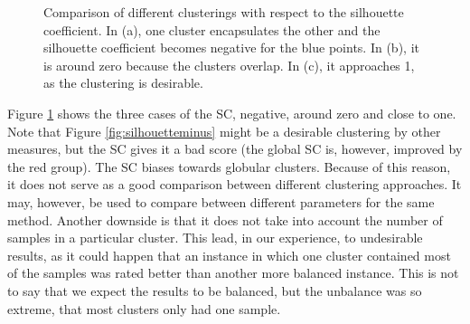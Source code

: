 \documentclass[conference]{IEEEtran}
\begin{document}
\begin{figure}[!h]
\centering
{}
\hfill
{}
\vfill
{}
\caption{Comparison of different clusterings with respect to the silhouette coefficient. In (a), one cluster encapsulates the other and the silhouette coefficient becomes negative for the blue points. In (b), it is around zero because the clusters overlap. In (c), it approaches 1, as the clustering is desirable. } 
\label{fig:silhouette}
\end{figure}


Figure \ref{fig:silhouette} shows the three cases of the SC, negative, around zero and close to one. Note that Figure \ref{fig:silhouetteminus} might be a desirable clustering by other measures, but the SC gives it a bad score (the global SC is, however, improved by the red group). The SC biases towards globular clusters. Because of this reason, it does not serve as a good comparison between different clustering approaches. It may, however, be used to compare between different parameters for the same method. Another downside is that it does not take into account the number of samples in a particular cluster. This lead, in our experience, to undesirable results, as it could happen that an instance in which one cluster contained most of the samples was rated better than another more balanced instance. This is not to say that we expect the results to be balanced, but the unbalance was so extreme, that most clusters only had one sample.
\end{document}
